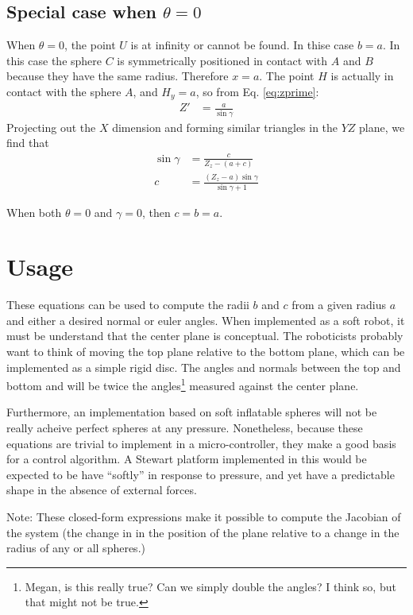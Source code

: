 \documentclass{article}
\begin{document}
\subsection{Special case when $\theta = 0$}

When $\theta = 0$, the point $U$ is at infinity or
cannot be found. In thise case $b = a$.
In this case the sphere $C$ is symmetrically
positioned in contact with $A$ and $B$ because
they have the same radius. Therefore $x = a$.
The point $H$ is actually in contact with the sphere $A$,
and $H_y = a$, so from Eq. \ref{eq:zprime}:
\begin{align}
  Z' &= \frac{a}{\sin{\gamma}}
  \end{align}
Projecting out the $X$ dimension and forming
similar triangles in the $YZ$ plane, we find that
\begin{align}
  \sin{\gamma} &= \frac{c}{Z_z - (a + c)} \\
  c &= \frac{ (Z_z -a) \sin{\gamma}}{\sin{\gamma} + 1}
  \end{align}

When both $\theta = 0$ and $\gamma = 0$, then $c = b = a$.

\section{Usage}

These equations can be used to compute the radii $b$ and $c$
from a given radius $a$ and either a desired normal or euler
angles. When implemented as a soft robot, it must be understand
that the center plane is conceptual. The roboticists probably
want to think of moving the top plane relative to the bottom plane,
which can be implemented as a simple rigid disc.
The angles and normals between the top and bottom and will be
twice the angles\footnote{Megan, is this really true? Can we simply double the angles? I think so, but that might not be true.} measured against the center plane.

Furthermore, an implementation based on soft inflatable spheres
will not be really acheive perfect spheres at any pressure.
Nonetheless, because these equations are trivial to implement
in a micro-controller, they make a good basis for a control
algorithm. A Stewart platform implemented in this would
be expected to be have ``softly'' in response to pressure,
and yet have a predictable shape in the absence of external
forces.

Note: These closed-form expressions make it possible to compute the Jacobian of the system (the change in in the position
of the plane relative to a change in the radius of any or all spheres.)

\printbibliography
\end{document}
